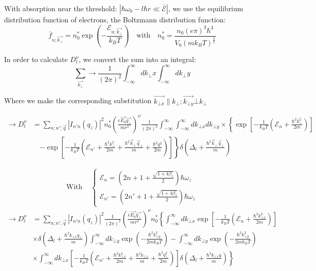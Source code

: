 \documentclass{article}
\begin{document}
With absorption near the threshold: $| \hbar \omega_0 - l \hbar r \ll \bar{\mathcal{E}} |$, we use the equilibrium distribution function of electrons, the Boltzmann distribution function:
$$\bar{f}_{n;\vec{k_\bot}} = n_0^* \exp{\left(-\dfrac{\mathcal{E}_{n;\vec{k_\bot}}}{k_B T} \right)} \quad \text{with} \quad n_0^*=\dfrac{n_0(e\pi)^3\hbar^3}{V_0(m k_B T)^{\frac{3}{2}}}$$

In order to calculate $D_l^\nu$, we convert the sum into an integral: $$ \sum_{\vec{k_\bot}} \to \dfrac{1}{(2\pi)^2} \int_{-\infty}^{\infty} d k_\bot x \int_{-\infty}^{\infty} d k_\bot y $$

Where we make the corresponding substitution $\vec{k_{\bot x}} \parallel k_\bot; \vec{k_{\bot y}}  \bot k_\bot$

\begin{align*}
    \rightarrow D_l^\nu &= \sum_{n; n'; \vec{q}} |I_{n'n}(q_z)|^2 n_0^* \left( \frac{e \vec{E_0} \vec{q_\bot}}{m r^2} \right)^\nu \frac{1}{(2\pi)^2} \int_{-\infty}^{\infty} \int_{-\infty}^{\infty} dk_{\bot x} dk_{\bot y} \times \left\{ \exp \left[ - \frac{1}{k_B T} \left( \mathcal{E}_n + \frac{\hbar^2 k_\bot^2}{2m} \right) \right] \right. \\
    &\quad \left. - \exp \left[ - \frac{1}{k_B T} \left( \mathcal{E}_{n'} + \frac{\hbar^2 k_\bot^2}{2m} + \frac{\hbar^2 \vec{k}_\bot \vec{q}_\bot}{m} + \frac{\hbar^2 q^2}{2m} \right) \right] \right\} \delta \left( \Delta_l + \frac{\hbar^2 \vec{k}_\bot \vec{q}_\bot}{m} \right)
\end{align*}

\begin{align*}
    \text{With } & \begin{cases}
        \mathcal{E}_n = \left( 2n + 1 + \frac{\sqrt{1 + 4\beta_z}}{2} \right) \hbar \omega_z \\
        \mathcal{E}_{n'} = \left( 2n' + 1 + \frac{\sqrt{1 + 4\beta_z}}{2} \right) \hbar \omega_z
    \end{cases}
\end{align*}
\begin{align*}
    \rightarrow D_l^\nu &= \sum_{n; n'; \vec{q}} |I_{n'n}(q_z)|^2 \frac{1}{(2\pi)^2} \left( \frac{e \vec{E_0} \vec{q_\bot}}{m r^2} \right)^\nu n_0^* \left\{ \int_{-\infty}^{\infty} dk_{\bot x} \exp \left[ - \frac{1}{k_B T} \left( \mathcal{E}_n + \frac{\hbar^2 k_{\bot x}^2}{2m} \right) \right] \right. \\
    & \left. \times \delta \left( \Delta_l + \frac{\hbar^2 k_{\bot x} q_\bot}{m} \right) \right. \int_{-\infty}^{\infty} dk_{\bot y} \exp \left( - \frac{\hbar^2 k_{\bot y}^2}{2m k_B T} \right) - \int_{-\infty}^{\infty} dk_{\bot y} \exp \left( - \frac{\hbar^2 k_{\bot y}^2}{2m k_B T} \right) \\
    &\times \int_{-\infty}^{\infty} dk_{\bot x} \left[ - \frac{1}{k_B T} \left( \mathcal{E}_{n'} + \frac{\hbar^2 k_{\bot x}^2}{2m} + \frac{\hbar^2 k_{\bot x} }{m} + \frac{\hbar^2 q_\bot^2}{2m} \right) \right] \left. \delta \left( \Delta_l + \frac{\hbar^2 k_{\bot x} q}{m} \right) \right\}
\end{align*}
\end{document}

